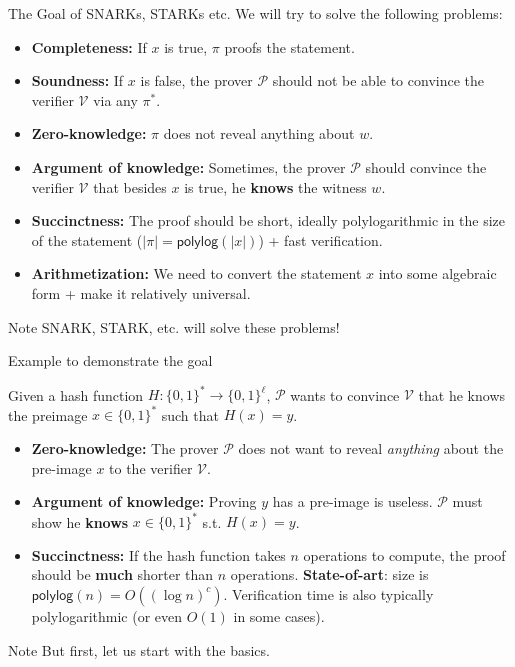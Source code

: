 \documentclass[xcolor={usenames,dvipsnames}]{beamer}
\begin{document}
    \begin{frame}{The Goal of SNARKs, STARKs etc.}
        We will try to solve the following problems:
        \begin{itemize}
            \item \textbf{Completeness:} If $x$ is true, $\pi$ proofs the statement.\pause
            \item \textbf{Soundness:} If $x$ is false, the prover $\mathcal{P}$ should not be able to convince the verifier $\mathcal{V}$ via any $\pi^*$.\pause
            \item \textbf{Zero-knowledge:} $\pi$ does not reveal anything about $w$.\pause
            \item \textbf{Argument of knowledge:} Sometimes, the prover $\mathcal{P}$ should convince the verifier $\mathcal{V}$ that besides $x$ is true, he \textbf{knows} the witness $w$.\pause
            \item \textbf{Succinctness:} The proof should be short, ideally polylogarithmic in the size of the statement ($|\pi| = \mathsf{polylog}(|x|)$) + fast verification.\pause
            \item \textbf{Arithmetization:} We need to convert the statement $x$ into some algebraic form + make it relatively universal.\pause
        \end{itemize}

        \begin{alertblock}{Note}
            SNARK, STARK, etc. will solve these problems!
        \end{alertblock}
    \end{frame}

    \begin{frame}{Example to demonstrate the goal}
        \begin{example}
            Given a hash function $H: \{0,1\}^* \to \{0,1\}^{\ell}$, $\mathcal{P}$ wants to convince $\mathcal{V}$ that he knows the preimage $x \in \{0,1\}^*$ such that $H(x) = y$.\pause
            \begin{itemize}
                \item \textbf{Zero-knowledge:} The prover $\mathcal{P}$ does not want to reveal \textit{anything} about the pre-image $x$ to the verifier $\mathcal{V}$.\pause
                \item \textbf{Argument of knowledge:} Proving $y$ has a pre-image is useless. $\mathcal{P}$ must show he \textbf{knows} $x \in \{0,1\}^*$ s.t. $H(x)=y$.\pause
                \item \textbf{Succinctness:} If the hash function takes $n$ operations to compute, the proof should be \textbf{much} shorter than $n$ operations. \textbf{State-of-art}: size is $\mathsf{polylog}(n) = O((\log n)^c)$. Verification time is also typically polylogarithmic (or even $O(1)$ in some cases).\pause
            \end{itemize}
        \end{example}

        \begin{block}{Note}
            But first, let us start with the basics.
        \end{block}
    \end{frame}
\end{document}
